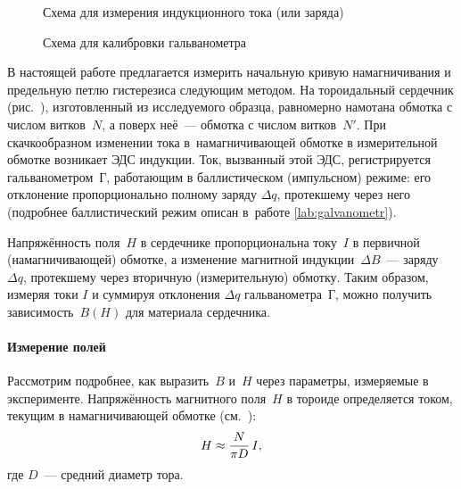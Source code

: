 
\begin{figure}[h!]
	\begin{minipage}[b]{0.55\textwidth}
		\caption{Схема для измерения индукционного тока (или заряда)}
	\end{minipage}%
\hfill
	\begin{minipage}[b]{0.4\textwidth}
        \centering
		\caption{Схема для калибровки гальванометра}
	\end{minipage}
\end{figure}

В настоящей работе предлагается измерить начальную кривую намагничивания
и предельную петлю гистерезиса следующим методом.
На тороидальный сердечник (рис.~), изготовленный из исследуемого образца,
равномерно намотана  обмотка 
с числом витков~$N$, а поверх неё~---  
обмотка с числом витков~$N'$.
При скачкообразном изменении тока в~намагничивающей обмотке
в измерительной обмотке возникает ЭДС индукции. Ток, вызванный
этой ЭДС, регистрируется гальванометром~Г, работающим в баллистическом
(импульсном) режиме: его отклонение пропорционально полному
заряду $\Delta q$, протекшему через него (подробнее баллистический режим
описан в~работе \ref{lab:galvanometr}).


Напряжённость поля~$H$ в сердечнике пропорциональна току~$I$ в первичной
(намагничивающей) обмотке, а изменение магнитной индукции~$\Delta B$~---
заряду $\Delta q$, протекшему через вторичную (измерительную) обмотку. 
Таким образом, измеряя токи $I$ и суммируя отклонения $\Delta q$ гальванометра~Г, 
можно получить зависимость~$B(H)$ для материала сердечника.

\paragraph{Измерение полей}
Рассмотрим подробнее, как выразить~$B$ и~$H$ через параметры, измеряемые в
эксперименте. Напряжённость магнитного поля~$H$ в тороиде определяется током,
текущим в намагничивающей обмотке (см.~):
\begin{equation}
	\eqmark{2}
	H\approx\frac{N}{\pi D}\,I,
\end{equation}
где $D$~--- средний диаметр тора.

